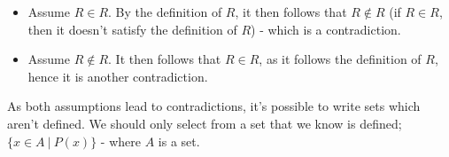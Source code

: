 \documentclass[a4paper, 12pt]{article}
\begin{document}
        \begin{itemize}
            \item Assume $R \in R$. By the definition of $R$, it then follows that $R \notin R$ (if $R \in R$, then it doesn't satisfy the definition of $R$) - which is a contradiction.
            \item Assume $R \notin R$. It then follows that $R \in R$, as it follows the definition of $R$, hence it is another contradiction.
        \end{itemize}

        As both assumptions lead to contradictions, it's possible to write sets which aren't defined. We should only select from a set that we know is defined; $\{x \in A\ |\ P(x)\}$ - where $A$ is a set.
    
\end{document}
